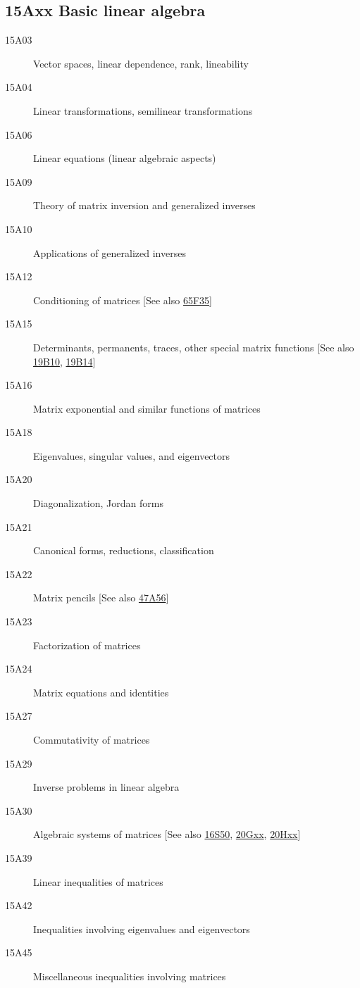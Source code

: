 \subsection*{15Axx  Basic linear algebra }\label{15Axx}
\begin{description}  
\item [15A03]\label{15A03} Vector spaces, linear dependence, rank, lineability
\item [15A04]\label{15A04} Linear transformations, semilinear transformations
\item [15A06]\label{15A06} Linear equations (linear algebraic aspects)
\item [15A09]\label{15A09} Theory of matrix inversion and generalized inverses
\item [15A10]\label{15A10} Applications of generalized inverses
\item [15A12]\label{15A12} Conditioning of matrices [See also \hyperref[65F35]{65F35}]
\item [15A15]\label{15A15} Determinants, permanents, traces, other special matrix functions [See also \hyperref[19B10]{19B10}, \hyperref[19B14]{19B14}]
\item [15A16]\label{15A16} Matrix exponential and similar functions of matrices
\item [15A18]\label{15A18} Eigenvalues, singular values, and eigenvectors
\item [15A20]\label{15A20} Diagonalization, Jordan forms
\item [15A21]\label{15A21} Canonical forms, reductions, classification
\item [15A22]\label{15A22} Matrix pencils [See also \hyperref[47A56]{47A56}]
\item [15A23]\label{15A23} Factorization of matrices
\item [15A24]\label{15A24} Matrix equations and identities
\item [15A27]\label{15A27} Commutativity of matrices
\item [15A29]\label{15A29} Inverse problems in linear algebra
\item [15A30]\label{15A30} Algebraic systems of matrices [See also \hyperref[16S50]{16S50}, \hyperref[20Gxx]{20Gxx}, \hyperref[20Hxx]{20Hxx}]
\item [15A39]\label{15A39} Linear inequalities of matrices
\item [15A42]\label{15A42} Inequalities involving eigenvalues and eigenvectors
\item [15A45]\label{15A45} Miscellaneous inequalities involving matrices

\end{description}
